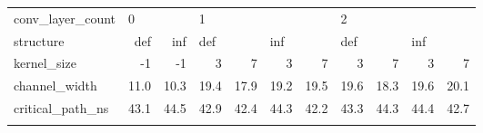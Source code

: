 \begin{tabular}{lrrrrrrrrrr}
	\toprule
	conv\_layer\_count & \multicolumn{2}{l}{0} & \multicolumn{4}{l}{1} & \multicolumn{4}{l}{2} \\
	structure &  def &  inf & \multicolumn{2}{l}{def} & \multicolumn{2}{l}{inf} & \multicolumn{2}{l}{def} & \multicolumn{2}{l}{inf} \\
	kernel\_size &         -1 &         -1 &          3 &          7 &          3 &          7 &          3 &          7 &         3 &          7 \\
	\midrule
	channel\_width    &  11.0 &  10.3 &  19.4 &  17.9 &  19.2 &  19.5 &  19.6 &  18.3 &  19.6 &  20.1 \\
	critical\_path\_ns &  43.1 &  44.5 &  42.9 &  42.4 &  44.3 &  42.2 &  43.3 &  44.3 &  44.4 &  42.7 \\
	\bottomrule
	\label{TODO bad values}
	\label{table:cnn-hyperopt-results}
\end{tabular}

